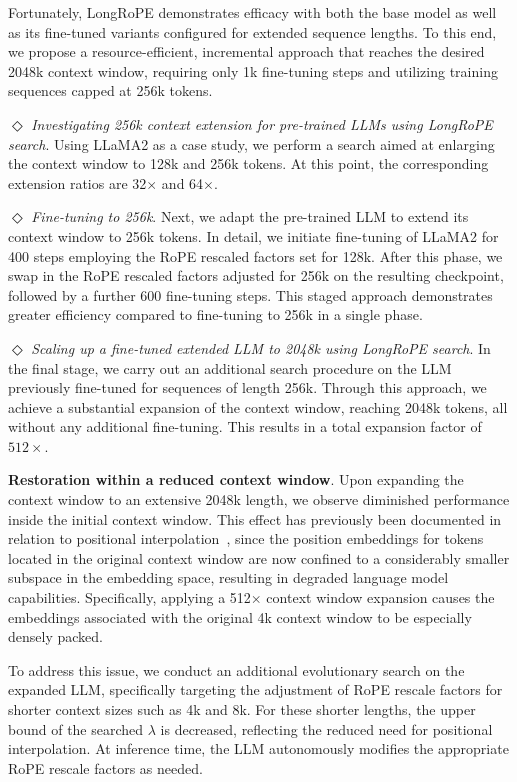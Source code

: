 Fortunately, LongRoPE demonstrates efficacy with both the base model as well as its fine-tuned variants configured for extended sequence lengths. To this end, we propose a resource-efficient, incremental approach that reaches the desired 2048k context window, requiring only 1k fine-tuning steps and utilizing training sequences capped at 256k tokens.

$\Diamond$ \textit{Investigating 256k context extension for pre-trained LLMs using LongRoPE search}. Using LLaMA2 as a case study, we perform a search aimed at enlarging the context window to 128k and 256k tokens. At this point, the corresponding extension ratios are 32$\times$ and 64$\times$.

$\Diamond$ \textit{Fine-tuning to 256k}. Next, we adapt the pre-trained LLM to extend its context window to 256k tokens. In detail, we initiate fine-tuning of LLaMA2 for 400 steps employing the RoPE rescaled factors set for 128k. After this phase, we swap in the RoPE rescaled factors adjusted for 256k on the resulting checkpoint, followed by a further 600 fine-tuning steps. This staged approach demonstrates greater efficiency compared to fine-tuning to 256k in a single phase.

$\Diamond$ \textit{Scaling up a fine-tuned extended LLM to 2048k using LongRoPE search}. In the final stage, we carry out an additional search procedure on the LLM previously fine-tuned for sequences of length 256k. Through this approach, we achieve a substantial expansion of the context window, reaching 2048k tokens, all without any additional fine-tuning. This results in a total expansion factor of $512\times$.

\textbf{Restoration within a reduced context window}. Upon expanding the context window to an extensive 2048k length, we observe diminished performance inside the initial context window. This effect has previously been documented in relation to positional interpolation~\cite{pi}, since the position embeddings for tokens located in the original context window are now confined to a considerably smaller subspace in the embedding space, resulting in degraded language model capabilities. Specifically, applying a 512$\times$ context window expansion causes the embeddings associated with the original 4k context window to be especially densely packed.

To address this issue, we conduct an additional evolutionary search on the expanded LLM, specifically targeting the adjustment of RoPE rescale factors for shorter context sizes such as 4k and 8k. For these shorter lengths, the upper bound of the searched $\lambda$ is decreased, reflecting the reduced need for positional interpolation. At inference time, the LLM autonomously modifies the appropriate RoPE rescale factors as needed.

